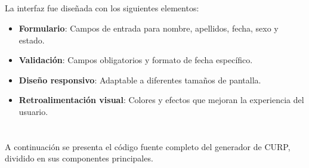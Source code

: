 \documentclass[10pt,a4paper]{article}
\begin{document}
\subsection{\color{colorESCOM}{Interfaz de Usuario}}
La interfaz fue diseñada con los siguientes elementos:
\begin{itemize}
	\item \textbf{Formulario}: Campos de entrada para nombre, apellidos, fecha, sexo y estado.
	\item \textbf{Validación}: Campos obligatorios y formato de fecha específico.
	\item \textbf{Diseño responsivo}: Adaptable a diferentes tamaños de pantalla.
	\item \textbf{Retroalimentación visual}: Colores y efectos que mejoran la experiencia del usuario.
\end{itemize}

\pagebreak

\section{\color{colorIPN}{Código Fuente}}
A continuación se presenta el código fuente completo del generador de CURP, dividido en sus componentes principales.
\end{document}
